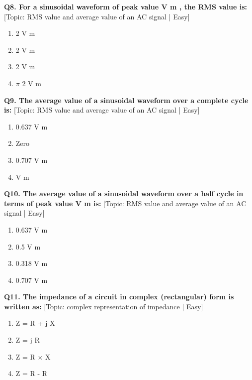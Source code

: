 \noindent\textbf{Q8. For a sinusoidal waveform of peak value V m , the RMS value is:} \hfill [Topic: RMS value and average value of an AC signal | Easy]
\begin{enumerate}[label=(\alph*),topsep=2pt,itemsep=1pt,partopsep=0pt,parsep=0pt]
    \item {2 V m}
    \item {2 V m}
    \item {2 V m}
    \item {$\pi$ 2 V m}
\end{enumerate}
\vspace{2mm}

\noindent\textbf{Q9. The average value of a sinusoidal waveform over a complete cycle is:} \hfill [Topic: RMS value and average value of an AC signal | Easy]
\begin{enumerate}[label=(\alph*),topsep=2pt,itemsep=1pt,partopsep=0pt,parsep=0pt]
    \item {0.637 V m}
    \item {Zero}
    \item {0.707 V m}
    \item {V m}
\end{enumerate}
\vspace{2mm}

\noindent\textbf{Q10. The average value of a sinusoidal waveform over a half cycle in terms of peak value V m is:} \hfill [Topic: RMS value and average value of an AC signal | Easy]
\begin{enumerate}[label=(\alph*),topsep=2pt,itemsep=1pt,partopsep=0pt,parsep=0pt]
    \item {0.637 V m}
    \item {0.5 V m}
    \item {0.318 V m}
    \item {0.707 V m}
\end{enumerate}
\vspace{2mm}

\noindent\textbf{Q11. The impedance of a circuit in complex (rectangular) form is written as:} \hfill [Topic: complex representation of impedance | Easy]
\begin{enumerate}[label=(\alph*),topsep=2pt,itemsep=1pt,partopsep=0pt,parsep=0pt]
    \item {Z = R + j X}
    \item {Z = j R}
    \item {Z = R $\times$ X}
    \item {Z = R - R}
\end{enumerate}
\vspace{2mm}

